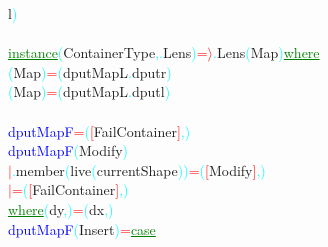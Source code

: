 {\rm{}l}\textcolor{cyan}{)}\\\\\textcolor{green}{\underline{instance}}\hsspace \textcolor{cyan}{(}{\rm{}ContainerType}\textcolor{cyan}{,}\textcolor{cyan}{.}{\rm{}Lens}\textcolor{cyan}{)}\hsspace \textcolor{red}{=\ensuremath{\rangle}}\textcolor{cyan}{.}{\rm{}Lens}\hsspace \textcolor{cyan}{(}{\rm{}Map}\textcolor{cyan}{)}\hsspace \textcolor{green}{\underline{where}}\\\hsspace \textcolor{cyan}{(}{\rm{}Map}\textcolor{cyan}{)}\hsspace \textcolor{red}{=}\hsspace \textcolor{cyan}{(}{\rm{}dputMapL}\textcolor{cyan}{.}{\rm{}dputr}\textcolor{cyan}{)}\\\hsspace \textcolor{cyan}{(}{\rm{}Map}\textcolor{cyan}{)}\hsspace \textcolor{red}{=}\hsspace \textcolor{cyan}{(}{\rm{}dputMapL}\textcolor{cyan}{.}{\rm{}dputl}\textcolor{cyan}{)}\\\\\textcolor{blue}{dputMapF}\hsspace \textcolor{red}{=}\hsspace \textcolor{cyan}{(}\textcolor{red}{[}{\rm{}FailContainer}\textcolor{red}{]}\textcolor{cyan}{,}\textcolor{cyan}{)}\\\textcolor{blue}{dputMapF}\hsspace \textcolor{cyan}{(}{\rm{}Modify}\textcolor{cyan}{)}\\\hstab \textcolor{red}{\ensuremath{|}}\textcolor{cyan}{.}{\rm{}member}\hsspace \textcolor{cyan}{(}{\rm{}live}\hsspace \textcolor{cyan}{(}{\rm{}currentShape}\textcolor{cyan}{)}\textcolor{cyan}{)}\hsspace \textcolor{red}{=}\hsspace \textcolor{cyan}{(}\textcolor{red}{[}{\rm{}Modify}\textcolor{red}{]}\textcolor{cyan}{,}\textcolor{cyan}{)}\\\hstab \textcolor{red}{\ensuremath{|}}\hsspace \textcolor{red}{=}\hsspace \textcolor{cyan}{(}\textcolor{red}{[}{\rm{}FailContainer}\textcolor{red}{]}\textcolor{cyan}{,}\textcolor{cyan}{)}\\\hstab \textcolor{green}{\underline{where}}\hsspace \textcolor{cyan}{(}{\rm{}dy}\textcolor{cyan}{,}\textcolor{cyan}{)}\hsspace \textcolor{red}{=}\hsspace \textcolor{cyan}{(}{\rm{}dx}\textcolor{cyan}{,}\textcolor{cyan}{)}\\\textcolor{blue}{dputMapF}\hsspace \textcolor{cyan}{(}{\rm{}Insert}\textcolor{cyan}{)}\hsspace \textcolor{red}{=}\hsspace \textcolor{green}{\underline{case}}\hsspace 
